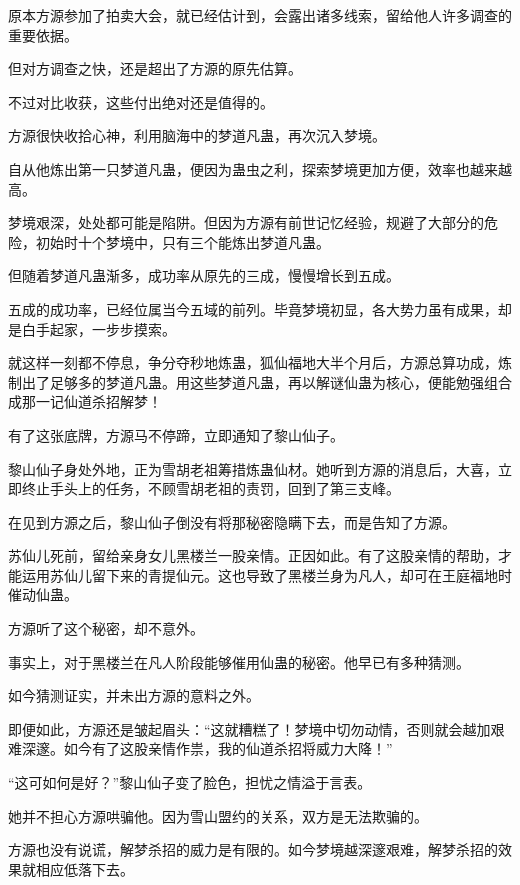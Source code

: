 
\begin{this_body}



原本方源参加了拍卖大会，就已经估计到，会露出诸多线索，留给他人许多调查的重要依据。

但对方调查之快，还是超出了方源的原先估算。

不过对比收获，这些付出绝对还是值得的。

方源很快收拾心神，利用脑海中的梦道凡蛊，再次沉入梦境。

自从他炼出第一只梦道凡蛊，便因为蛊虫之利，探索梦境更加方便，效率也越来越高。

梦境艰深，处处都可能是陷阱。但因为方源有前世记忆经验，规避了大部分的危险，初始时十个梦境中，只有三个能炼出梦道凡蛊。

但随着梦道凡蛊渐多，成功率从原先的三成，慢慢增长到五成。

五成的成功率，已经位属当今五域的前列。毕竟梦境初显，各大势力虽有成果，却是白手起家，一步步摸索。

就这样一刻都不停息，争分夺秒地炼蛊，狐仙福地大半个月后，方源总算功成，炼制出了足够多的梦道凡蛊。用这些梦道凡蛊，再以解谜仙蛊为核心，便能勉强组合成那一记仙道杀招解梦！

有了这张底牌，方源马不停蹄，立即通知了黎山仙子。

黎山仙子身处外地，正为雪胡老祖筹措炼蛊仙材。她听到方源的消息后，大喜，立即终止手头上的任务，不顾雪胡老祖的责罚，回到了第三支峰。

在见到方源之后，黎山仙子倒没有将那秘密隐瞒下去，而是告知了方源。

苏仙儿死前，留给亲身女儿黑楼兰一股亲情。正因如此。有了这股亲情的帮助，才能运用苏仙儿留下来的青提仙元。这也导致了黑楼兰身为凡人，却可在王庭福地时催动仙蛊。

方源听了这个秘密，却不意外。

事实上，对于黑楼兰在凡人阶段能够催用仙蛊的秘密。他早已有多种猜测。

如今猜测证实，并未出方源的意料之外。

即便如此，方源还是皱起眉头：“这就糟糕了！梦境中切勿动情，否则就会越加艰难深邃。如今有了这股亲情作祟，我的仙道杀招将威力大降！”

“这可如何是好？”黎山仙子变了脸色，担忧之情溢于言表。

她并不担心方源哄骗他。因为雪山盟约的关系，双方是无法欺骗的。

方源也没有说谎，解梦杀招的威力是有限的。如今梦境越深邃艰难，解梦杀招的效果就相应低落下去。


\end{this_body}
